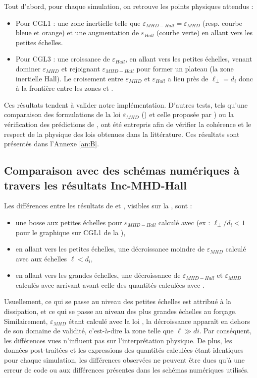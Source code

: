  Tout d'abord, pour chaque simulation, on retrouve les points physiques attendus : 
 \begin{itemize}
     \item Pour CGL1 : une zone inertielle  telle que $\varepsilon_{MHD-Hall} = \varepsilon_{MHD}$ (resp. courbe bleue et orange) et une augmentation de $\varepsilon_{Hall}$ (courbe verte) en allant vers les petites échelles.
     \item Pour CGL3 : une croissance de $\varepsilon_{Hall}$, en allant vers les petites échelles, venant dominer $\varepsilon_{MHD}$ et rejoignant $\varepsilon_{MHD-Hall}$ pour former un plateau (la zone inertielle \acs{Hall}). Le croisement entre $\varepsilon_{MHD}$ et $\varepsilon_{Hall}$ a lieu près de $\ell_{\perp} = d_i$ donc à la frontière entre les zones  et .
 \end{itemize}
 Ces résultats tendent à valider notre implémentation. D'autres tests, tels qu'une comparaison des formulations de la loi $\varepsilon_{MHD}$ () et celle proposée par \cite{banerjee_exact_2017}) ou la vérification des prédictions de \cite{andres_energy_2018}, ont été entrepris afin de vérifier la cohérence et le respect de la physique des lois obtenues dans la littérature. Ces résultats sont présentés dans l'Annexe \ref{an:B}.
  
 \subsection{Comparaison avec des schémas numériques à travers les résultats Inc-MHD-Hall}
 
 Les différences entre les résultats de  et , visibles sur la , sont : 
 \begin{itemize}
     \item une bosse aux petites échelles pour $\varepsilon_{MHD-Hall}$ calculé avec  (ex : $\ell_{\perp}/d_i < 1$ pour le graphique sur CGL1 de la ),
     \item en allant vers les petites échelles, une décroissance moindre de $\varepsilon_{MHD}$ calculé avec  aux échelles $\ell < d_i$, 
     \item en allant vers les grandes échelles, une décroissance de $\varepsilon_{MHD-Hall}$ et $\varepsilon_{MHD}$ calculés avec  arrivant avant celle des quantités calculées avec .
 \end{itemize}
 Usuellement, ce qui se passe au niveau des petites échelles est attribué à la dissipation, et ce qui se passe au niveau des plus grandes échelles au forçage. Similairement,  $\varepsilon_{MHD}$ étant calculé avec la loi , la décroissance apparaît en dehors de son domaine de validité, c'est-à-dire la zone  telle que $\ell \gg di$. Par conséquent, les différences vues n'influent pas sur l'interprétation physique. De plus, les données post-traitées et les expressions des quantités calculées étant identiques pour chaque simulation, les différences observées ne peuvent être dues qu'à une erreur de code ou aux différences présentes dans les schémas numériques utilisés. 
 
